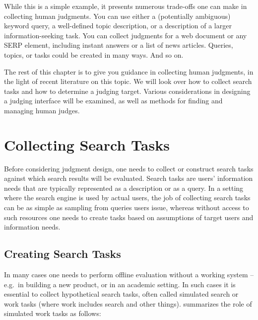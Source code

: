 While this is a simple example, it presents numerous trade-offs one can make in collecting human judgments. You can use either a (potentially ambiguous) keyword query, a well-defined topic description, or a description of a larger information-seeking task. You can collect judgments for a web document or any SERP element, including instant answers or a list of news articles. Queries, topics, or tasks could be created in many ways. And so on. 

The rest of this chapter is to give you guidance in collecting human judgments, in the light of recent literature on this topic. We will look over how to collect search tasks and how to determine a judging target. Various considerations in designing a judging interface will be examined, as well as methods for finding and managing human judges.



\section{Collecting Search Tasks}
Before considering judgment design, one needs to collect or construct search tasks against which search results will be evaluated. Search tasks are users' information needs that are typically represented as a description or as a query. In a setting where the search engine is used by actual users, the job of collecting search tasks can be as simple as sampling from queries users issue, whereas without access to such resources one needs to create tasks based on assumptions of target users and information needs. 

\subsection{Creating Search Tasks}
In many cases one needs to perform offline evaluation without a working system -- e.g.\ in building a new product, or in an academic setting. In such cases it is essential to collect hypothetical search tasks, often called simulated search or work tasks (where work includes search and other things). \cite{Borlund:2003} summarizes the role of simulated work tasks as follows:

